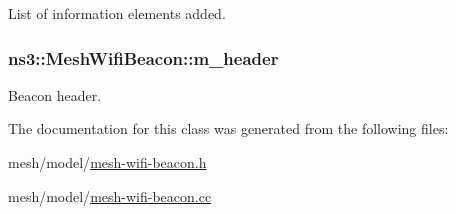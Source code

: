 List of information elements added. 

\subsubsection[{\texorpdfstring{m\+\_\+header}{m_header}}]{ ns3\+::\+Mesh\+Wifi\+Beacon\+::m\+\_\+header\hspace{0.3cm}{\ttfamily [private]}}\hypertarget{classns3_1_1MeshWifiBeacon_aaa37103b1dd877ba598a42fe4f411ade}{}\label{classns3_1_1MeshWifiBeacon_aaa37103b1dd877ba598a42fe4f411ade}


Beacon header. 



The documentation for this class was generated from the following files\+:\begin{DoxyCompactItemize}
\item 
mesh/model/\hyperlink{mesh-wifi-beacon_8h}{mesh-\/wifi-\/beacon.\+h}\item 
mesh/model/\hyperlink{mesh-wifi-beacon_8cc}{mesh-\/wifi-\/beacon.\+cc}\end{DoxyCompactItemize}
